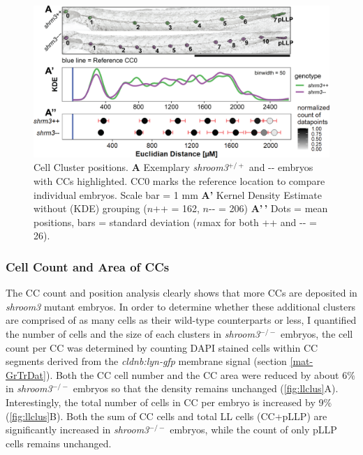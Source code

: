 \documentclass[10pt, b5paper, singlespacinge, twoside]{reedthesis} %
\theoremstyle{definition}
\theoremstyle{definition}
\theoremstyle{definition}
\theoremstyle{remark}
\begin{document}
\begin{figure}

{\centering \includegraphics[width=0.85\linewidth]{figures/results/01_morphometrics/ll_positions} 

}

\caption[Cell Cluster Positions]{Cell Cluster positions. \textbf{A} Exemplary \emph{shroom3}\(^{+/+}\) and -\/- embryos with CCs highlighted. CC0 marks the reference location to compare individual embryos. Scale bar = 1 mm \textbf{A'} Kernel Density Estimate without (KDE) grouping (\(n\)++ = 162, \(n\)-\/- = 206) \textbf{A'\,'} Dots = mean positions, bars = standard deviation (\(n\)max for both ++ and -\/- = 26).}\label{fig:llpos}
\end{figure}
\hypertarget{res-llmorph}{%
\subsubsection{Cell Count and Area of CCs}\label{res-llmorph}}

The CC count and position analysis clearly shows that more CCs are deposited in \emph{shroom3} mutant embryos. In order to determine whether these additional clusters are comprised of as many cells as their wild-type counterparts or less, I quantified the number of cells and the size of each clusters in \emph{shroom3}\(^{-/-}\) embryos, the cell count per CC was determined by counting DAPI stained cells within CC segments derived from the \emph{cldnb:lyn-gfp} membrane signal (section \ref{mat-GrTrDat}). Both the CC cell number and the CC area were reduced by about 6\(\%\) in \emph{shroom3}\(^{-/-}\) embryos so that the density remains unchanged (\ref{fig:llclus}A). Interestingly, the total number of cells in CC per embryo is increased by 9\(\%\) (\ref{fig:llclus}B). Both the sum of CC cells and total LL cells (CC+pLLP) are significantly increased in \emph{shroom3}\(^{-/-}\) embryos, while the count of only pLLP cells remains unchanged.
\end{document}
